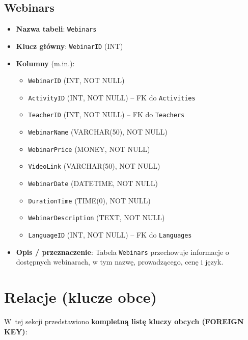 \documentclass[12pt]{article}
\begin{document}
\subsection{Webinars}
\begin{itemize}
    \item \textbf{Nazwa tabeli}: \texttt{Webinars}
    \item \textbf{Klucz główny}: \texttt{WebinarID} (INT)
    \item \textbf{Kolumny} (m.in.):
          \begin{itemize}
            \item \texttt{WebinarID} (INT, NOT NULL)
            \item \texttt{ActivityID} (INT, NOT NULL) -- FK do \texttt{Activities}
            \item \texttt{TeacherID} (INT, NOT NULL) -- FK do \texttt{Teachers}
            \item \texttt{WebinarName} (VARCHAR(50), NOT NULL)
            \item \texttt{WebinarPrice} (MONEY, NOT NULL)
            \item \texttt{VideoLink} (VARCHAR(50), NOT NULL)
            \item \texttt{WebinarDate} (DATETIME, NOT NULL)
            \item \texttt{DurationTime} (TIME(0), NOT NULL)
            \item \texttt{WebinarDescription} (TEXT, NOT NULL)
            \item \texttt{LanguageID} (INT, NOT NULL) -- FK do \texttt{Languages}
          \end{itemize}
    \item \textbf{Opis / przeznaczenie}:  
          Tabela \texttt{Webinars} przechowuje informacje o dostępnych webinarach, w tym nazwę, prowadzącego, cenę i język.
\end{itemize}

\newpage
\section{Relacje (klucze obce)}

W~tej sekcji przedstawiono \textbf{kompletną listę kluczy obcych (FOREIGN KEY)}:
\end{document}
